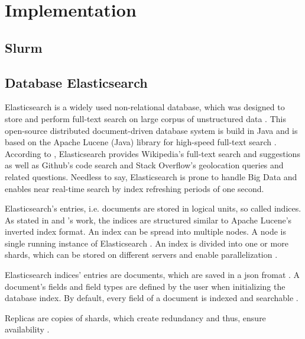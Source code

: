 \newcommand{\databaseName}{Elasticsearch}
\chapter{Implementation}\label{ch:implementation}


\section{Slurm}\label{subsec:slurm}
\cite{slurm2003}
\cite{slurm-online}




\section{Database Elasticsearch}\label{subsec:db}
\databaseName{} is a widely used non-relational database, which was designed to store and perform full-text search on large corpus of unstructured data \cite{Elasticsearch2017}.
This open-source distributed document-driven database system is build in Java and is based on the Apache Lucene (Java) library for high-speed full-text search \cite{Elasticsearch2017,Elasticsearch2019}.
According to \cite{Elasticsearch2019}, \databaseName{} provides Wikipedia's full-text search and suggestions as well as Github's code search and Stack Overflow's geolocation queries and related questions.
Needless to say, \databaseName{} is prone to handle Big Data and enables near real-time search by index refreshing periods of one second.

\databaseName{}'s entries, i.e. documents are stored in logical units, so called indices.
As stated in \citeauthor{Elasticsearch2019} and \citeauthor{Elasticsearch2017}'s work, the indices are structured similar to Apache Lucene's inverted index format.
An index can be spread into multiple nodes.
A node is single running instance of \databaseName{} \cite{Elasticsearch2019}.
An index is divided into one or more shards, which can be stored on different servers and enable parallelization \cite{Elasticsearch2019}.

\databaseName{} indices' entries are documents, which are saved in a \ac{json} fromat \cite{Elasticsearch2017}.
A document's fields and field types are defined by the user when initializing the database index.
By default, every field of a document is indexed and searchable \cite{Elasticsearch2019}.

Replicas are copies of shards, which create redundancy and thus, ensure availability \cite{Elasticsearch2019}.

